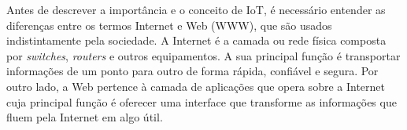 Antes de descrever a importância e o conceito de \ac{IoT}, é necessário entender as diferenças entre os termos Internet e Web (\ac{WWW}), que são usados indistintamente pela sociedade. A Internet é a camada ou rede física composta por \textit{switches}, \textit{routers} e outros equipamentos. A sua principal função é transportar informações de um ponto para outro de forma rápida, confiável e segura. Por outro lado, a Web pertence à camada de aplicações que opera sobre a Internet cuja principal função é oferecer uma interface que transforme as informações que fluem pela Internet em algo útil\cite{Evans2011a}.



	
	




